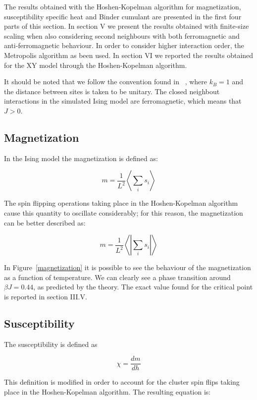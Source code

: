 \documentclass[twoside]{article}
\def\mean#1{\left< #1 \right>}
\begin{document}
\begin{multicols}{2}
The results obtained with the Hoshen-Kopelman algorithm for magnetization, susceptibility specific heat and Binder cumulant are presented in the first four parts of this section.
In section V we present the results obtained with finite-size scaling when also considering second neighbours with both ferromagnetic and anti-ferromagnetic behaviour. In order to consider higher interaction order, the Metropolis algorithm as been used.
In section VI we reported the results obtained for the XY model through the Hoshen-Kopelman algorithm.

It should be noted that we follow the convention found in ~\cite{thijssen}, where $k_B = 1$ and the distance between sites is taken to be unitary. The closed neighbout interactions in the simulated Ising model are ferromagnetic, which means that $J > 0$.

\subsection{Magnetization}
In the Ising model the magnetization is defined as:

\begin{equation}
m = \frac{1}{L^2} \mean{\sum_i s_i}
\label{magnetization_conventional}
\end{equation}

The spin flipping operations taking place in the Hoshen-Kopelman algorithm cause this quantity to oscillate considerably; for this reason, the magnetization can be better described as:

\begin{equation}
m = \frac{1}{L^2} \mean{\left|\sum_i s_i\right|}
\end{equation}

In Figure~\ref{magnetization} it is possible to see the behaviour of the magnetization as a function of temperature. We can clearly see a phase transition around $\beta J = 0.44$, as predicted by the theory. The exact value found for the critical point is reported in section III.V.

\subsection{Susceptibility}
The susceptibility is defined as 

\begin{equation}
\chi = \frac{dm}{dh}
\end{equation}

This definition is modified in order to account for the cluster spin flips taking place in the Hoshen-Kopelman algorithm. The resulting equation is:


\end{multicols}
\end{document}
